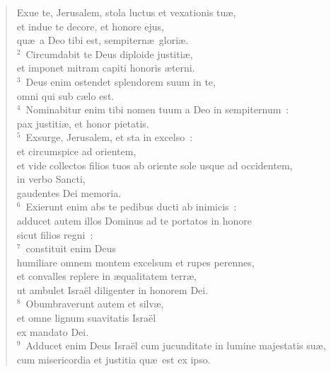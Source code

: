 \begin{flushleft}\begin{verse}\vspace{-19pt}Exue te, Jerusalem, stola luctus et vexationis tu\ae ,\\ et indue te decore, et honore ejus,\\ qu\ae\ a Deo tibi est, sempitern\ae\ glori\ae .\\
${}^{2}$~Circumdabit te Deus diploide justiti\ae ,\\ et imponet mitram capiti honoris \ae terni.\\
${}^{3}$~Deus enim ostendet splendorem suum in te,\\ omni qui sub c\ae lo est.\\
${}^{4}$~Nominabitur enim tibi nomen tuum a Deo in sempiternum~:\\ pax justiti\ae , et honor pietatis.\\
${}^{5}$~Exsurge, Jerusalem, et sta in excelso~:\\ et circumspice ad orientem,\\ et vide collectos filios tuos ab oriente sole usque ad occidentem,\\ in verbo Sancti,\\ gaudentes Dei memoria.\\
${}^{6}$~Exierunt enim abs te pedibus ducti ab inimicis~:\\ adducet autem illos Dominus ad te portatos in honore\\ sicut filios regni~:\\
${}^{7}$~constituit enim Deus\\ humiliare omnem montem excelsum et rupes perennes,\\ et convalles replere in \ae qualitatem terr\ae ,\\ ut ambulet Isra\"el diligenter in honorem Dei.\\
${}^{8}$~Obumbraverunt autem et silv\ae ,\\ et omne lignum suavitatis Isra\"el\\ ex mandato Dei.\\
${}^{9}$~Adducet enim Deus Isra\"el cum jucunditate in lumine majestatis su\ae ,\\ cum misericordia et justitia qu\ae\ est ex ipso.\end{verse}\end{flushleft}


